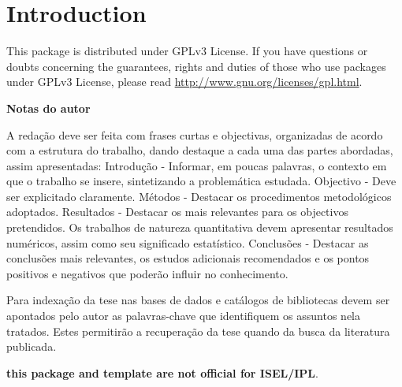 % 
%  
%
\chapter{Introduction}
\label{cha:introduction}

This package is distributed under GPLv3 License. If you have questions or  doubts concerning the guarantees, rights and duties of those who use packages under GPLv3 License, please read \url{http://www.gnu.org/licenses/gpl.html}.


\textbf{Notas do autor}

A redação deve ser feita com frases curtas e objectivas, organizadas de acordo com a estrutura do trabalho, dando destaque a cada uma das partes abordadas, assim apresentadas: Introdução - Informar, em poucas palavras, o contexto em que o trabalho se insere, sintetizando a problemática estudada. Objectivo - Deve ser explicitado claramente. Métodos - Destacar os procedimentos metodológicos adoptados. Resultados - Destacar os mais relevantes para os objectivos pretendidos. Os trabalhos de natureza quantitativa devem apresentar resultados numéricos, assim como seu significado estatístico. Conclusões - Destacar as conclusões mais relevantes, os estudos adicionais recomendados e os pontos positivos e negativos que poderão influir no conhecimento. 

Para indexação da tese nas bases de dados e catálogos de bibliotecas devem ser apontados pelo autor as palavras-chave que identifiquem os assuntos nela tratados. Estes permitirão a recuperação da tese quando da busca da literatura publicada. 

\begin{center}
	\textbf{\large this package and template are not official for ISEL/IPL}.
\end{center}
